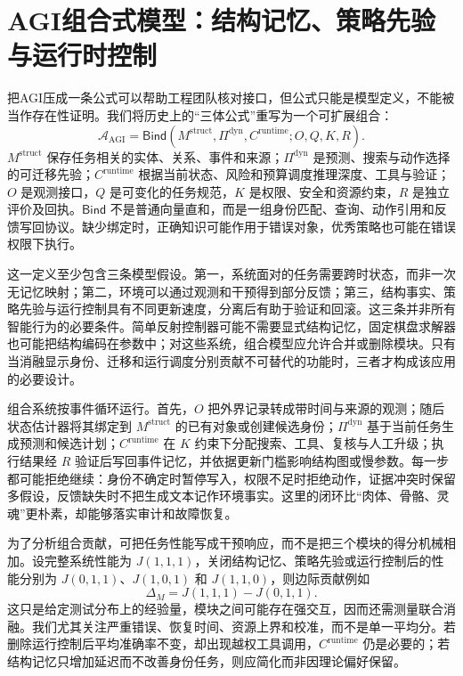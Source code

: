 \section{AGI组合式模型：结构记忆、策略先验与运行时控制}
\label{sec:cpd_ultimate_agi_formula}

把AGI压成一条公式可以帮助工程团队核对接口，但公式只能是模型定义，不能被当作存在性证明。我们将历史上的“三体公式”重写为一个可扩展组合：
\[
 \mathcal{A}_{\mathrm{AGI}}
 =\mathsf{Bind}\!\left(
 M^{\mathrm{struct}},
 \Pi^{\mathrm{dyn}},
 C^{\mathrm{runtime}};
 O,Q,K,R
 \right).
\]
$M^{\mathrm{struct}}$ 保存任务相关的实体、关系、事件和来源；$\Pi^{\mathrm{dyn}}$ 是预测、搜索与动作选择的可迁移先验；$C^{\mathrm{runtime}}$ 根据当前状态、风险和预算调度推理深度、工具与验证；$O$ 是观测接口，$Q$ 是可变化的任务规范，$K$ 是权限、安全和资源约束，$R$ 是独立评价及回执。$\mathsf{Bind}$ 不是普通向量直和，而是一组身份匹配、查询、动作引用和反馈写回协议。缺少绑定时，正确知识可能作用于错误对象，优秀策略也可能在错误权限下执行。

这一定义至少包含三条模型假设。第一，系统面对的任务需要跨时状态，而非一次无记忆映射；第二，环境可以通过观测和干预得到部分反馈；第三，结构事实、策略先验与运行控制具有不同更新速度，分离后有助于验证和回滚。这三条并非所有智能行为的必要条件。简单反射控制器可能不需要显式结构记忆，固定棋盘求解器也可能把结构编码在参数中；对这些系统，组合模型应允许合并或删除模块。只有当消融显示身份、迁移和运行调度分别贡献不可替代的功能时，三者才构成该应用的必要设计。

组合系统按事件循环运行。首先，$O$ 把外界记录转成带时间与来源的观测；随后状态估计器将其绑定到 $M^{\mathrm{struct}}$ 的已有对象或创建候选身份；$\Pi^{\mathrm{dyn}}$ 基于当前任务生成预测和候选计划；$C^{\mathrm{runtime}}$ 在 $K$ 约束下分配搜索、工具、复核与人工升级；执行结果经 $R$ 验证后写回事件记忆，并依据更新门槛影响结构图或慢参数。每一步都可能拒绝继续：身份不确定时暂停写入，权限不足时拒绝动作，证据冲突时保留多假设，反馈缺失时不把生成文本记作环境事实。这里的闭环比“肉体、骨骼、灵魂”更朴素，却能够落实审计和故障恢复。

为了分析组合贡献，可把任务性能写成干预响应，而不是把三个模块的得分机械相加。设完整系统性能为 $J(1,1,1)$，关闭结构记忆、策略先验或运行控制后的性能分别为 $J(0,1,1)$、$J(1,0,1)$ 和 $J(1,1,0)$，则边际贡献例如
\[
 \Delta_M=J(1,1,1)-J(0,1,1).
\]
这只是给定测试分布上的经验量，模块之间可能存在强交互，因而还需测量联合消融。我们尤其关注严重错误、恢复时间、资源上界和校准，而不是单一平均分。若删除运行控制后平均准确率不变，却出现越权工具调用，$C^{\mathrm{runtime}}$ 仍是必要的；若结构记忆只增加延迟而不改善身份任务，则应简化而非因理论偏好保留。

